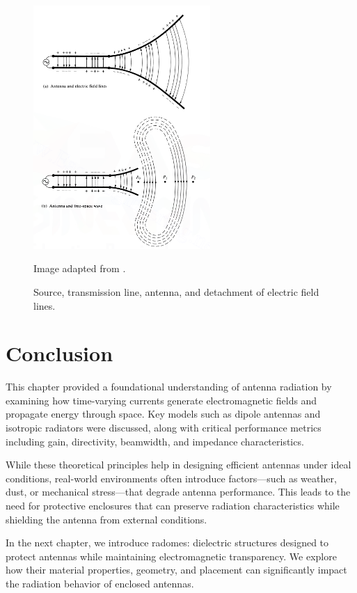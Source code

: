 \begin{figure}[H]
    \centering
    \includegraphics[width=0.6\textwidth]{figures/radiation.png}
    \caption{Source, transmission line, antenna, and detachment of electric field lines.}
    \small Image adapted from \cite{balanis}.
    \label{fig:radiation-overview}
\end{figure}

\section*{Conclusion}

This chapter provided a foundational understanding of antenna radiation by examining how time-varying currents generate electromagnetic fields and propagate energy through space. Key models such as dipole antennas and isotropic radiators were discussed, along with critical performance metrics including gain, directivity, beamwidth, and impedance characteristics.

While these theoretical principles help in designing efficient antennas under ideal conditions, real-world environments often introduce factors—such as weather, dust, or mechanical stress—that degrade antenna performance. This leads to the need for protective enclosures that can preserve radiation characteristics while shielding the antenna from external conditions.

In the next chapter, we introduce radomes: dielectric structures designed to protect antennas while maintaining electromagnetic transparency. We explore how their material properties, geometry, and placement can significantly impact the radiation behavior of enclosed antennas.

